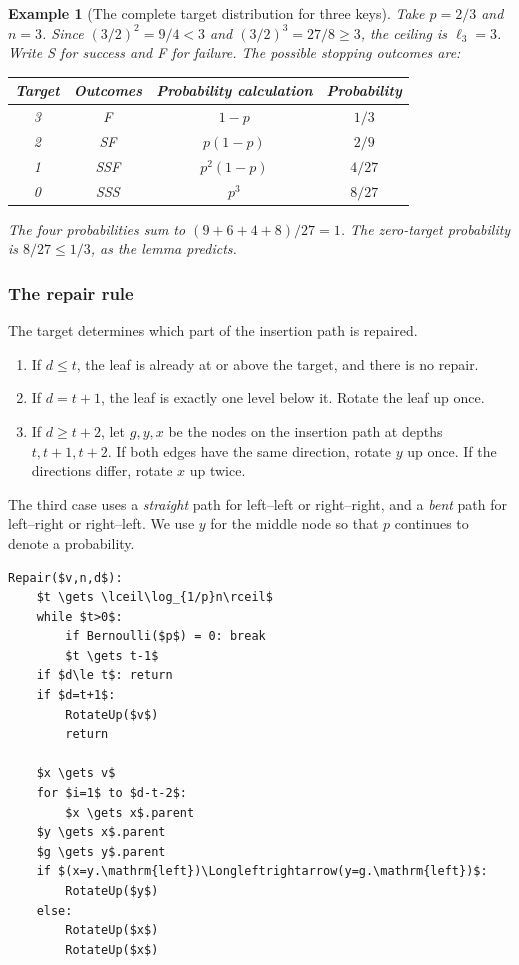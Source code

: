 \documentclass[11pt,a4paper]{article}
\theoremstyle{readable}
\newtheorem{example}[theorem]{Example}
\begin{document}
\begin{example}[The complete target distribution for three keys]
Take $p=2/3$ and $n=3$. Since $(3/2)^2=9/4<3$ and
$(3/2)^3=27/8\ge3$, the ceiling is $\ell_3=3$. Write S for success
and F for failure. The possible stopping outcomes are:
\begin{center}
\begin{tabular}{cccc}
\toprule
Target & Outcomes & Probability calculation & Probability \\
\midrule
3 & F & $1-p$ & $1/3$ \\
2 & SF & $p(1-p)$ & $2/9$ \\
1 & SSF & $p^2(1-p)$ & $4/27$ \\
0 & SSS & $p^3$ & $8/27$ \\
\bottomrule
\end{tabular}
\end{center}
The four probabilities sum to $(9+6+4+8)/27=1$. The zero-target
probability is $8/27\le1/3$, as the lemma predicts.
\end{example}

\subsubsection*{The repair rule}
The target determines which part of the insertion path is repaired.
\begin{enumerate}
  \item If $d\le t$, the leaf is already at or above the target, and
        there is no repair.
  \item If $d=t+1$, the leaf is exactly one level below it. Rotate
        the leaf up once.
  \item If $d\ge t+2$, let $g,y,x$ be the nodes on the insertion
        path at depths $t,t+1,t+2$. If both edges have the same
        direction, rotate $y$ up once. If the directions differ,
        rotate $x$ up twice.
\end{enumerate}
The third case uses a \emph{straight} path for left--left or right--right,
and a \emph{bent} path for left--right or right--left. We use $y$ for
the middle node so that $p$ continues to denote a probability.

\noindent\begin{minipage}{\linewidth}
\begin{lstlisting}[caption={Repair; the probability $p$ is fixed globally.}]
Repair($v,n,d$):
    $t \gets \lceil\log_{1/p}n\rceil$
    while $t>0$:
        if Bernoulli($p$) = 0: break
        $t \gets t-1$
    if $d\le t$: return
    if $d=t+1$:
        RotateUp($v$)
        return

    $x \gets v$
    for $i=1$ to $d-t-2$:
        $x \gets x$.parent
    $y \gets x$.parent
    $g \gets y$.parent
    if $(x=y.\mathrm{left})\Longleftrightarrow(y=g.\mathrm{left})$:
        RotateUp($y$)
    else:
        RotateUp($x$)
        RotateUp($x$)
\end{lstlisting}
\end{minipage}
\end{document}
